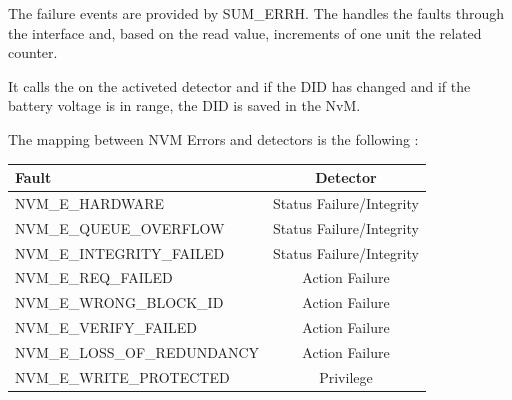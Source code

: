 {
The failure events  are provided by SUM\_ERRH. \newline\newline
The \textbf{} handles the faults through the interface  and, based on the read value, increments  of one unit the related counter.
 
 
It calls the  on the activeted detector and if the DID has changed and if the battery voltage is in range, the DID is saved in the NvM.\newline\newline


The mapping between NVM Errors and detectors is the following :\newline

\begin{center}\begin{tabular}{|l|c|}
\hline
\textbf{Fault}                & \textbf{Detector}               \\ \hline
NVM\_E\_HARDWARE              &  Status Failure/Integrity       \\ \hline
NVM\_E\_QUEUE\_OVERFLOW     &  Status Failure/Integrity       \\ \hline
NVM\_E\_INTEGRITY\_FAILED           &  Status Failure/Integrity       \\ \hline
NVM\_E\_REQ\_FAILED       &  Action Failure                 \\ \hline
NVM\_E\_WRONG\_BLOCK\_ID      &  Action Failure                 \\ \hline
NVM\_E\_VERIFY\_FAILED        &  Action Failure                 \\ \hline
NVM\_E\_LOSS\_OF\_REDUNDANCY   &  Action Failure                 \\ \hline
NVM\_E\_WRITE\_PROTECTED      &  Privilege                      \\ \hline
\hline
\end{tabular}\end{center}

}
{
} 

